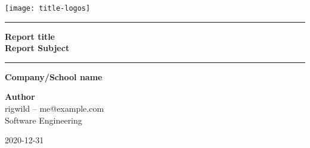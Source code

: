 \begin{titlepage}
\begin{center}

\texttt{[image: title-logos]}~\\[2cm]

\hrule
\vspace{0.4cm}

{\LARGE \bfseries Report title\\
Report Subject\\[0.4cm]}

\hrule
\vspace{1cm}

{\large \bfseries Company/School name\\[0.2cm]}

\vspace{3cm}

\large\textbf{Author}\\
rigwild – me@example.com\\
Software Engineering\\[1cm]

\vfill

{\large 2020-12-31}

\end{center}
\end{titlepage}

